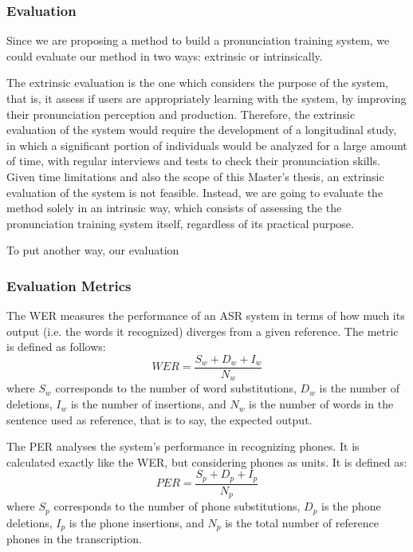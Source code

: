 \subsubsection{Evaluation}

Since we are proposing a method to build a pronunciation training system, we could
evaluate our method in two ways: extrinsic or intrinsically.

The extrinsic evaluation is the one which considers the purpose of the system, that is,
it assess if users are appropriately learning with the system, by improving their 
pronunciation perception and production. Therefore, the extrinsic evaluation of the
system would require the development of a longitudinal study, in which a significant 
portion of individuals would be analyzed for a large amount of time, with regular interviews
and tests to check their pronunciation skills. Given time limitations and also the scope
of this Master's thesis, an extrinsic evaluation of the system is not feasible. Instead, we 
are going to evaluate the method solely in an intrinsic way, which consists 
of assessing the the pronunciation training system itself, regardless of its practical purpose.

To put another way, our evaluation 

\subsubsection{Evaluation Metrics}

The \ac{WER} measures the performance of an \ac{ASR} system in terms of how
much its output (i.e. the words it recognized) diverges from a given reference. The metric
is defined as follows:
\begin{equation}
 \textit{WER}=\frac{S_w+D_w+I_w}{N_w}
\end{equation}
where $S_w$ corresponds to the number of word substitutions, $D_w$ is the number of deletions, 
$I_w$ is the number of insertions, and $N_w$ is the number of words in the sentence used
as reference, that is to say, the expected output.

The \ac{PER} analyses the system's performance in recognizing phones. It
is calculated exactly like the \ac{WER}, but considering phones as units. It is defined as:
\begin{equation}
 \textit{PER}=\frac{S_p+D_p+I_p}{N_p}
\end{equation}
where $S_p$ corresponds to the number of phone substitutions, $D_p$ is the phone deletions, 
$I_p$ is the phone insertions, and $N_p$ is the total number of reference phones in 
the transcription.

